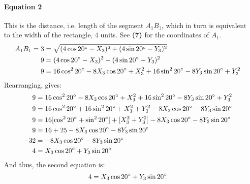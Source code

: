 \documentclass{article}
\begin{document}
            \paragraph{Equation 2} This is the distance, i.e. length of the segment $A_1B_1$, which in turn is equivalent to the width of the rectangle, 4 units. See \textbf{(7)} for the coordinates of $A_1$.
            \begin{align*}
                A_1B_1 = 3 &= \sqrt{(4\cos{20\degree} - X_3)^2 + (4\sin{20\degree} - Y_3)^2} \\
                9 &= (4\cos{20\degree} - X_3)^2 + (4\sin{20\degree} - Y_3)^2 \\
                9 &= 16\cos^2{20\degree} - 8X_3\cos{20\degree} + X_3^2 + 16\sin^2{20\degree} - 8Y_3\sin{20\degree} + Y_3^2
            \end{align*}
            Rearranging, gives:
            \begin{align*}
                9 &= 16\cos^2{20\degree} - 8X_3\cos{20\degree} + X_3^2 + 16\sin^2{20\degree} - 8Y_3\sin{20\degree} + Y_3^2 \\
                9 &= 16\cos^2{20\degree} + 16\sin^2{20\degree} + X_3^2 + Y_3^2 - 8X_3\cos{20\degree} - 8Y_3\sin{20\degree} \\
                9 &= 16[\cos^2{20\degree} + \sin^2{20\degree}] + [X_3^2 + Y_3^2] - 8X_3\cos{20\degree} - 8Y_3\sin{20\degree} \\
                9 &= 16 + 25 - 8X_3\cos{20\degree} - 8Y_3\sin{20\degree} \\
                -32 &= - 8X_3\cos{20\degree} - 8Y_3\sin{20\degree} \\
                4 &= X_3\cos{20\degree} + Y_3\sin{20\degree}
            \end{align*}
            And thus, the second equation is:
            \begin{equation}
                4 = X_3\cos{20\degree} + Y_3\sin{20\degree}
            \end{equation}
\end{document}
